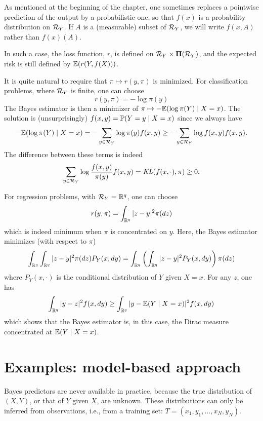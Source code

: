 \begin{remark}
\label{rem:pred.prob}
As mentioned at the beginning of the chapter, one sometimes replaces a pointwise prediction of the output by a probabilistic one, so that $f(x)$ is a probability distribution on ${\mathcal R}_Y$. If $A$ is a (measurable) subset of ${\mathcal R}_Y$, we will write $f(x, A)$ rather than $f(x)(A)$. 

In such a case, the loss function, $r$, is defined on ${\mathcal R}_Y \times \bm\Pi({\mathcal R}_Y)$, and the expected risk is still defined by
$\bm{\mathbb E}(r(Y, f(X)))$.

It is quite natural to require that $\pi \mapsto r(y, \pi)$ is minimized. For classification problems, where ${\mathcal R}_Y$ is finite, one can choose
\begin{equation}
\label{eq:risk.mle}
r(y, \pi) = - \log \pi(y)
\end{equation}
The Bayes estimator is then a minimizer of $\pi \mapsto -\bm{\mathbb E}(\log\pi(Y)\mid X=x)$. The solution is (unsurprisingly) $f(x,y) = \bm{\mathbb P}(Y=y \mid X=x) $ since we always have
\[
-\bm{\mathbb E}(\log\pi(Y)\mid X=x) = -\sum_{y\in{\mathcal R}_Y} \log\pi(y) f(x,y) \geq  -\sum_{y\in{\mathcal R}_Y} \log f(x,y) f(x,y).
\]
The difference between these terms is indeed
\[
\sum_{y\in{\mathcal R}_Y} \log \frac{f(x,y)}{\pi(y)} f(x,y) = \mathit{KL}(f(x, \cdot), \pi) \geq 0.
\]

For regression problems, with ${\mathcal R}_Y = {\mathbb{R}}^q$, one can choose
\[
r(y, \pi) = \int_{{\mathbb{R}}^q} |z - y|^2 \pi(dz)
\]
which is indeed minimum when $\pi$ is concentrated on $y$. Here, the Bayes estimator minimizes (with respect to $\pi$)
\[
\int_{{\mathbb{R}}^q} \int_{{\mathbb{R}}^q} |z - y|^2 \pi(dz) P_Y(x, dy) = \int_{{\mathbb{R}}^q} \left(\int_{{\mathbb{R}}^q} |z - y|^2 P_Y(x, dy)\right) \pi(dz) 
\]
where $P_Y(x, \cdot)$ is the conditional distribution of $Y$ given $X=x$. For any $z$, one has
\[
\int_{{\mathbb{R}}^q} |y - z|^2 f(x, dy) \geq \int_{{\mathbb{R}}^q} |y - \bm{\mathbb E}(Y\mid X=x)|^2 f(x, dy)
\]
which shows that the Bayes estimator is, in this case, the Dirac measure concentrated at $\bm{\mathbb E}(Y\mid X=x)$.

\end{remark}

\section{Examples: model-based approach}
Bayes predictors are never  available in practice, because the
true distribution of $(X,Y)$, or that of $Y$ given $X$, are unknown. These distributions can only be inferred from observations, i.e., from a training set: $T = (x_1, y_1,
\ldots, x_N, y_N)$. 

